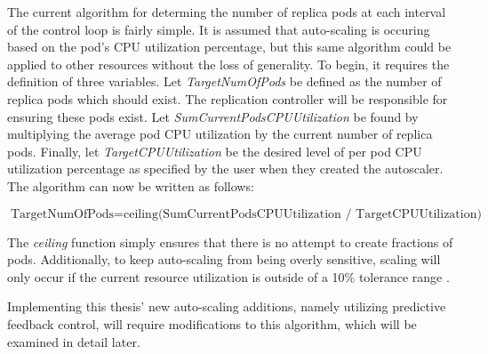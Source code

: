 The current algorithm for determing the number of replica pods at each interval
of the control loop is fairly simple. It is assumed that auto-scaling is
occuring based on the pod's CPU utilization percentage, but this same algorithm
could be applied to other resources without the loss of generality.
To begin, it requires the definition of
three variables. Let \textit{TargetNumOfPods} be defined as the number of
replica pods which should exist. The replication controller will be responsible
for ensuring these pods exist. Let \textit{SumCurrentPodsCPUUtilization} be
found by multiplying the average pod CPU utilization by the current number of
replica pods. Finally, let \textit{TargetCPUUtilization} be the desired level of
per pod CPU utilization percentage as specified by the user when they created
the autoscaler. The algorithm can now be written as follows:

\[ \mbox{TargetNumOfPods} = \mbox{ceiling(SumCurrentPodsCPUUtilization /
TargetCPUUtilization)} \]

The \textit{ceiling} function simply ensures that there is no attempt to create
fractions of pods. Additionally, to keep auto-scaling from being overly
sensitive, scaling will only occur if the current resource utilization is
outside of a 10\% tolerance range \cite{k8s-horizontal-pod-autoscaler-proposal}.

Implementing this thesis' new auto-scaling additions, namely utilizing
predictive feedback control, will require modifications to this algorithm, which
will be examined in detail later.
